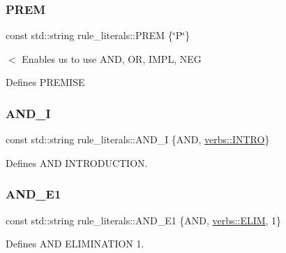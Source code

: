 \subsubsection{\texorpdfstring{P\+R\+EM}{PREM}}
{\footnotesize\ttfamily const std\+::string rule\+\_\+literals\+::\+P\+R\+EM \{\char`\"{}P\char`\"{}\}}



$<$ Enables us to use A\+ND, OR, I\+M\+PL, N\+EG 

Defines P\+R\+E\+M\+I\+SE \mbox{\label{namespacerule__literals_a94631d6e4135b29c6bacb5cde1d9719b}} 
\subsubsection{\texorpdfstring{A\+N\+D\+\_\+I}{AND\_I}}
{\footnotesize\ttfamily const std\+::string rule\+\_\+literals\+::\+A\+N\+D\+\_\+I \{A\+ND, \mbox{\hyperlink{namespaceverbs_a160cd2b49b96eb11b6db907bf94b5c3a}{verbs\+::\+I\+N\+T\+RO}}\}}



Defines A\+ND I\+N\+T\+R\+O\+D\+U\+C\+T\+I\+ON. 

\mbox{\label{namespacerule__literals_af7751bceefaea1ff69733140731b7770}} 
\subsubsection{\texorpdfstring{A\+N\+D\+\_\+\+E1}{AND\_E1}}
{\footnotesize\ttfamily const std\+::string rule\+\_\+literals\+::\+A\+N\+D\+\_\+\+E1 \{A\+ND, \mbox{\hyperlink{namespaceverbs_ae28355cc9321ebee9abcd23bb6e1b836}{verbs\+::\+E\+L\+IM}}, \textquotesingle{}1\textquotesingle{}\}}



Defines A\+ND E\+L\+I\+M\+I\+N\+A\+T\+I\+ON 1. 

\mbox{\label{namespacerule__literals_a0861b2e3104a4c1465d3dbbb362b5d10}} 
